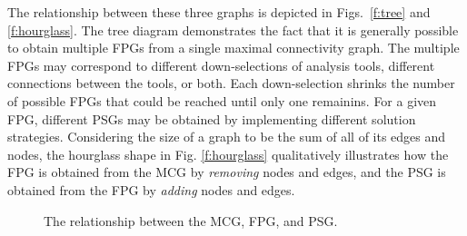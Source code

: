   The relationship between these three graphs is depicted in Figs.~\ref{f:tree} and \ref{f:hourglass}. 
  The tree diagram demonstrates the fact that it is generally possible to obtain 
  multiple FPGs from a single maximal connectivity graph. The multiple FPGs may correspond to 
  different down-selections of analysis tools, different connections between the tools, 
  or both. Each down-selection shrinks the number of possible FPGs that could be reached 
  until only one remainins. For a given FPG, different PSGs may be obtained by implementing 
  different solution strategies. Considering the size of a graph to be the sum of all of its
  edges and nodes, the hourglass shape in Fig. \ref{f:hourglass} qualitatively illustrates how
  the FPG is obtained from the MCG by \emph{removing} nodes and edges, 
  and the PSG is obtained from the FPG by \emph{adding} nodes and edges.
  \begin{figure}[htb!]
    \centering
  \caption{The relationship between the MCG, FPG, and PSG.}
  \end{figure}